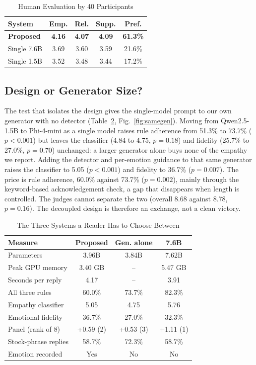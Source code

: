 \documentclass[conference]{IEEEtran}
\begin{document}
\begin{table}[htbp]
\caption{Human Evaluation by 40 Participants}
\begin{center}
\begin{tabular}{|l|c|c|c|c|}
\hline
\textbf{System} & \textbf{Emp.} & \textbf{Rel.} & \textbf{Supp.} & \textbf{Pref.} \\
\hline
\textbf{Proposed} & \textbf{4.16} & \textbf{4.07} & \textbf{4.09} & \textbf{61.3\%} \\
Single 7.6B & 3.69 & 3.60 & 3.59 & 21.6\% \\
Single 1.5B & 3.52 & 3.48 & 3.44 & 17.2\% \\
\hline
\end{tabular}
\label{tab:human}
\end{center}
\end{table}

\subsection{Design or Generator Size?}
The test that isolates the design gives the single-model prompt to our own generator with no detector (Table~\ref{tab:three}, Fig.~\ref{fig:samegen}). Moving from Qwen2.5-1.5B to Phi-4-mini as a single model raises rule adherence from 51.3\% to 73.7\% ($p<0.001$) but leaves the classifier (4.84 to 4.75, $p=0.18$) and fidelity (25.7\% to 27.0\%, $p=0.70$) unchanged: a larger generator alone buys none of the empathy we report. Adding the detector and per-emotion guidance to that same generator raises the classifier to 5.05 ($p<0.001$) and fidelity to 36.7\% ($p=0.007$). The price is rule adherence, 60.0\% against 73.7\% ($p=0.002$), mainly through the keyword-based acknowledgement check, a gap that disappears when length is controlled. The judges cannot separate the two (overall 8.68 against 8.78, $p=0.16$). The decoupled design is therefore an exchange, not a clean victory.

\begin{table}[htbp]
\caption{The Three Systems a Reader Has to Choose Between}
\begin{center}
\begin{tabular}{|l|c|c|c|}
\hline
\textbf{Measure} & \textbf{Proposed} & \textbf{Gen. alone} & \textbf{7.6B} \\
\hline
Parameters & 3.96B & 3.84B & 7.62B \\
Peak GPU memory & 3.40 GB & -- & 5.47 GB \\
Seconds per reply & 4.17 & -- & 3.91 \\
All three rules & 60.0\% & 73.7\% & 82.3\% \\
Empathy classifier & 5.05 & 4.75 & 5.76 \\
Emotional fidelity & 36.7\% & 27.0\% & 32.3\% \\
Panel (rank of 8) & +0.59 (2) & +0.53 (3) & +1.11 (1) \\
Stock-phrase replies & 58.7\% & 72.3\% & 58.7\% \\
Emotion recorded & Yes & No & No \\
\hline
\end{tabular}
\label{tab:three}
\end{center}
\end{table}
\end{document}
